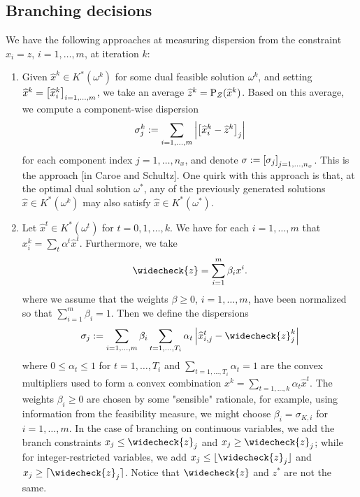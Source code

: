 \subsection{Branching decisions}
We have the following approaches at measuring dispersion from the constraint $x_i=z$, $i=1,\dots,m$, at iteration $k$:
\begin{enumerate}
\item Given $\widehat{x}^k \in K^*(\omega^k)$ for some dual feasible solution $\omega^k$, and 
setting $\widehat{x}^k=\left[ \widehat{x}_i^k \right]_{i=1,\dots,m}$, we take an average $\widehat{z}^k = \text{P}_Z(\widehat{x}^k)$. Based on this average,
we compute a component-wise dispersion 
$$\sigma_j^k:=\sum_{i=1,\dots,m} \left| \left[ \widehat{x}_i^k - \widehat{z}^k \right]_j \right|$$%
for each component index $j=1,\dots,n_x$, and denote $\sigma:=\left[ \sigma_j \right]_{j=1,\dots,n_x}$. This is the approach [in Caroe and Schultz]. One quirk with this approach is that, at the optimal dual solution $\omega^*$, any of the previously generated solutions $\widehat{x} \in K^*(\omega^k)$ may also satisfy $\widehat{x} \in K^*(\omega^*)$. 
\item Let $\widehat{x}^t \in K^*(\omega^t)$ for $t=0,1,\dots,k$. We have for each $i=1,\dots,m$ that $x_i^k = \sum_{t} \alpha^t \widehat{x}^t$. Furthermore, we take 
$$\widecheck{z} = \sum_{i=1}^m \beta_i x^i.$$ 
where we assume that the weights $\beta \ge 0$, $i=1,\dots,m$, have been normalized so that $\sum_{i=1}^m \beta_i = 1$.
Then we define the dispersions
$$
\sigma_j := \sum_{i=1,\dots,m} \beta_i \sum_{t=1,\dots,T_i} \alpha_t \left|\widehat{x}_{i,j}^t - \widecheck{z}_{j}^k \right| 
$$
where $0 \le \alpha_t \le 1$ for $t=1,\dots,T_i$ and $\sum_{t=1,\dots,T_i} \alpha_t = 1$ are the convex multipliers used to form a convex combination $x^k = \sum_{t=1,\dots,k} \alpha_t\widehat{x}^t$. The weights $\beta_i \ge 0$ are chosen by some "sensible" rationale, for example, using information from the feasibility measure, we might choose $\beta_i = \sigma_{K,i}$ for $i=1,\dots,m$. In the case of branching on continuous variables, we add the branch constraints $x_j \le \widecheck{z}_j$ and $x_j \ge \widecheck{z}_j$; while for integer-restricted variables, we add $x_j \le \lfloor \widecheck{z}_j \rfloor$ and $x_j \ge \lceil \widecheck{z}_j \rceil$. Notice that $\widecheck{z}$ and $z^*$ are not the same.
\end{enumerate}

